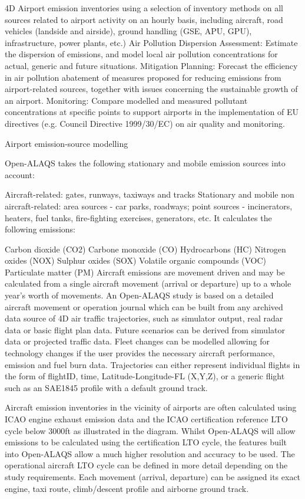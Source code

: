 \documentclass[a4paper]{article}
\begin{document}
    4D Airport emission inventories using a selection of inventory methods on all sources related to airport activity on an hourly basis, including aircraft, road vehicles (landside and airside), ground handling (GSE, APU, GPU), infrastructure, power plants, etc.)
    Air Pollution Dispersion Assessment: Estimate the dispersion of emissions, and model local air pollution concentrations for actual, generic and future situations.
    Mitigation Planning: Forecast the efficiency in air pollution abatement of measures proposed for reducing emissions from airport-related sources, together with issues concerning the sustainable growth of an airport.
    Monitoring: Compare modelled and measured pollutant concentrations at specific points to support airports in the implementation of EU directives (e.g. Council Directive 1999/30/EC) on air quality and monitoring.
    
    Airport emission-source modelling
    
    Open-ALAQS takes the following stationary and mobile emission sources into account:
    
    Aircraft-related: gates, runways, taxiways and tracks
    Stationary and mobile non aircraft-related: area sources - car parks, roadways; point sources - incinerators, heaters, fuel tanks, fire-fighting exercises, generators, etc.
    It calculates the following emissions:
    
    Carbon dioxide (CO2)
    Carbone monoxide (CO)
    Hydrocarbons (HC)
    Nitrogen oxides (NOX)
    Sulphur oxides (SOX)
    Volatile organic compounds (VOC)
    Particulate matter (PM)
    Aircraft emissions are movement driven and may be calculated from a single aircraft movement (arrival or departure) up to a whole year’s worth of movements. An Open-ALAQS study is based on a detailed aircraft movement or operation journal which can be built from any archived data source of 4D air traffic  trajectories, such as simulator output, real radar data or basic flight plan data. Future scenarios can be derived from simulator data or projected traffic data. Fleet changes can be modelled allowing for technology changes if the user provides the necessary aircraft performance, emission and fuel burn data. Trajectories can either represent individual flights in the form of flightID, time, Latitude-Longitude-FL (X,Y,Z), or a generic flight such as an SAE1845 profile with a default ground track.
    
    Aircraft emission inventories in the vicinity of airports are often calculated using ICAO engine exhaust emission data and the ICAO certification reference LTO cycle below 3000ft as illustrated in the diagram. Whilst Open-ALAQS will allow emissions to be calculated using the certification LTO cycle, the features built into Open-ALAQS allow a much higher resolution and accuracy to be used. The operational aircraft LTO cycle can be defined in more detail depending on the study requirements. Each movement (arrival, departure) can be assigned its exact engine, taxi route, climb/descent profile and airborne ground track. 
    
\end{document}
